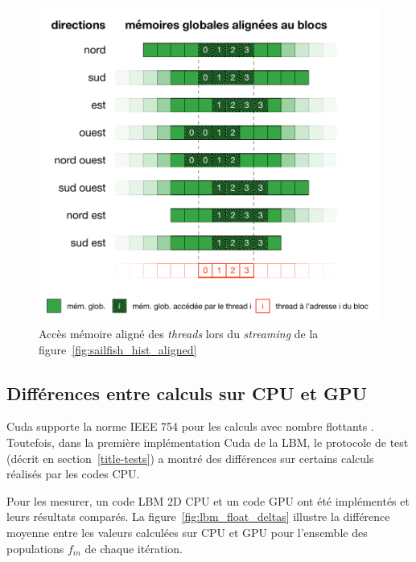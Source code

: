 \begin{figure}[h]
	\centering
	\includegraphics[fbox,scale=0.95]{images/streaming/sailfish_hist_dir_aligned.pdf}
	\caption{Accès mémoire aligné des \textit{threads} lors du \textit{streaming} de la figure~\ref{fig:sailfish_hist_aligned}}
	\label{fig:sailfish_hist_dir_aligned}
\end{figure}

\subsection{Différences entre calculs sur CPU et GPU} \label{title-floats}
Cuda supporte la norme IEEE 754 pour les calculs avec nombre flottants \cite{ZZZweb_cuda_2017}. Toutefois, dans la première implémentation Cuda de la \acs{LBM}, le protocole de test (décrit en section~\ref{title-tests}) a montré des différences sur certains calculs réalisés par les codes \ac{CPU}.

Pour les mesurer, un code \ac{LBM} 2D \ac{CPU} et un code \ac{GPU} ont été implémentés et leurs résultats comparés. La figure~\ref{fig:lbm_float_deltas} illustre la différence moyenne entre les valeurs calculées sur \ac{CPU} et \ac{GPU} pour l'ensemble des populations $f_{in}$ de chaque itération.

